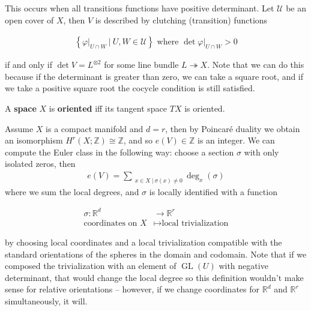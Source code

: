 \begin{example}[?]

This occurs when all transitions functions have positive determinant.
Let \(\mathcal U\) be an open cover of \(X\), then \(V\) is described by
clutching (transition) functions

\begin{align*} \left\{{ {\left.{{\varphi}} \right|_{{U \cap W}} }  {~\mathrel{\Big|}~}U,W\in\mathcal U}\right\} \text{ where } \det  {\left.{{\varphi}} \right|_{{U\cap W}} }  > 0 \end{align*}

if and only if \(\det V = L^{\otimes 2}\) for some line bundle
\(L \twoheadrightarrow X\). Note that we can do this because if the
determinant is greater than zero, we can take a square root, and if we
take a positive square root the cocycle condition is still satisfied.

\end{example}

\begin{definition}

A \textbf{space} \(X\) is \textbf{oriented} iff its tangent space \(TX\)
is oriented.

\end{definition}

Assume \(X\) is a compact manifold and \(d=r\), then by Poincaré duality
we obtain an isomorphism \(H^r(X; {\mathbb{Z}}) \cong {\mathbb{Z}}\),
and so \(e(V)\in {\mathbb{Z}}\) is an integer. We can compute the Euler
class in the following way: choose a section \(\sigma\) with only
isolated zeros, then
\begin{align*}
e(V) = \sum_{~~x\in X {~\mathrel{\Big|}~}\sigma(x) \neq 0} \deg_x(\sigma)
\end{align*}
where we sum the local degrees, and \(\sigma\) is locally identified
with a function

\begin{align*} \sigma: {\mathbb{R}}^d &\to {\mathbb{R}}^r \\ \text{coordinates on } X &\mapsto \text{local trivialization} \end{align*}

by choosing local coordinates and a local trivialization compatible with
the standard orientations of the spheres in the domain and codomain.
Note that if we composed the trivialization with an element of
\(\operatorname{GL}(U)\) with negative determinant, that would change
the local degree so this definition wouldn't make sense for relative
orientations -- however, if we change coordinates for \({\mathbb{R}}^d\)
and \({\mathbb{R}}^r\) simultaneously, it will.

